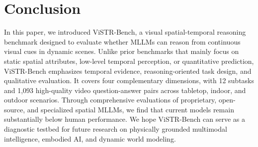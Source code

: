 \section{Conclusion}
In this paper, we introduced ViSTR-Bench, a visual spatial-temporal reasoning benchmark designed to evaluate whether MLLMs can reason from continuous visual cues in dynamic scenes. 
Unlike prior benchmarks that mainly focus on static spatial attributes, low-level temporal perception, or quantitative prediction, ViSTR-Bench emphasizes temporal evidence, reasoning-oriented task design, and qualitative evaluation. It covers four complementary dimensions, with 12 subtasks and 1,093 high-quality video question-answer pairs across tabletop, indoor, and outdoor scenarios. Through comprehensive evaluations of proprietary, open-source, and specialized spatial MLLMs, we find that current models remain substantially below human performance. We hope ViSTR-Bench can serve as a diagnostic testbed for future research on physically grounded multimodal intelligence, embodied AI, and dynamic world modeling.
